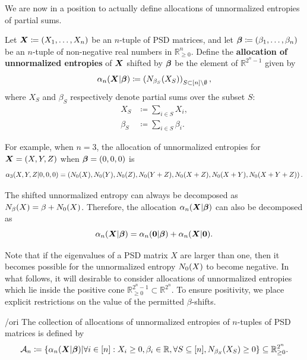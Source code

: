 \documentclass[notitlepage, 10pt]{article}
\begin{document}
We are now in a position to actually define allocations of unnormalized entropies of partial sums.
\begin{defn}
    Let $\boldsymbol{X} \coloneqq (X_1, \ldots, X_n)$ be an $n$-tuple of PSD matrices,
    and let $\boldsymbol{\beta} \coloneqq (\beta_1, \ldots, \beta_n)$ be an $n$-tuple of non-negative real numbers in $\mathbb R_{\geq 0}^{n}$.
    Define the \textbf{allocation of unnormalized entropies} of $\boldsymbol{X}$ shifted by $\boldsymbol{\beta}$ be the element of $\mathbb R^{2^n - 1}$ given by
    \begin{equation}
        \alpha_{n}(\boldsymbol{X}| \boldsymbol{\beta}) \coloneqq \left(N_{\beta_{S}}(X_S)\right)_{S \subset [n] \setminus \emptyset},
    \end{equation}
    where $X_S$ and $\beta_{S}$ respectively denote partial sums over the subset $S$:
    \begin{align}
        X_S &\coloneqq \sum_{i\in S}X_i, \\
        \beta_{S} &\coloneqq \sum_{i\in S}\beta_i.
    \end{align}
\end{defn}
\begin{exam}
    For example, when $n=3$, the allocation of unnormalized entropies for $\boldsymbol{X} = (X,Y,Z)$ when $\boldsymbol{\beta} = (0,0,0)$ is
    \begin{equation}
        \alpha_{3}(X, Y, Z|0,0,0) = \left(N_{0}(X), N_{0}(Y), N_{0}(Z), N_{0}(Y+Z), N_{0}(X+Z), N_{0}(X+Y), N_{0}(X+Y+Z) \right).
    \end{equation}
\end{exam}
\begin{rem}
    The shifted unnormalized entropy can always be decomposed as $N_{\beta}(X) = \beta + N_0(X)$.
    Therefore, the allocation $\alpha_n(\boldsymbol{X} | \boldsymbol{\beta})$ can also be decomposed as
    \begin{equation}
        \alpha_n(\boldsymbol{X} | \boldsymbol{\beta}) = \alpha_n(\boldsymbol{0} | \boldsymbol{\beta}) + \alpha_n(\boldsymbol{X} | \boldsymbol{0}).
    \end{equation}
\end{rem}
Note that if the eigenvalues of a PSD matrix $X$ are larger than one, then it becomes possible for the unnormalized entropy $N_0(X)$ to become negative. 
In what follows, it will desirable to consider allocations of unnormalized entropies which lie inside the positive cone $\mathbb R_{\geq 0}^{2^n-1} \subset \mathbb R^{2^n}$.
To ensure positivity, we place explicit restrictions on the value of the permitted $\beta$-shifts.
\begin{defn}/ori
    The collection of allocations of unnormalized entropies of $n$-tuples of PSD matrices is defined by
    \begin{equation}
        \mathcal A_{n} \coloneqq
        \left\{ \alpha_{n} ( \boldsymbol{X} | \boldsymbol{\beta}) \middle| \forall i \in [n] : X_i \geq 0, \beta_i \in \mathbb R, \forall S \subseteq [n], N_{\beta_S}(X_S) \geq 0 \right\} \subseteq \mathbb R^{2^n}_{\geq 0}.
    \end{equation}
\end{defn}
\end{document}
